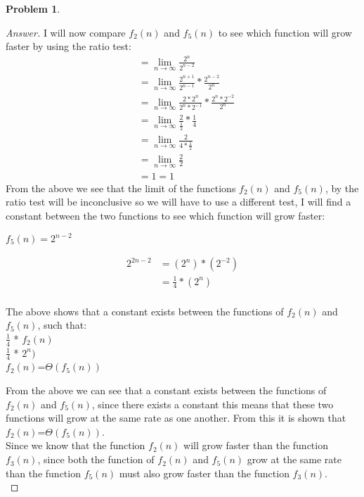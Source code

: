 \documentclass[11pt]{article}
\theoremstyle{definition}
\theoremstyle{definition}
\newtheorem{required}{Problem}
\theoremstyle{definition}
\begin{document}
\begin{required}
\begin{enumerate}[label=(\alph*)]
\begin{proof}[Answer]
I will now compare $f_2(n)$ and $f_5(n)$ to see which function will grow faster by using the ratio test: \\
\begin{align*}
&= \lim_{n \to \infty} \frac{2^n}{2^{n-2}} \\
&= \lim_{n \to \infty} \frac{2^{n+1}}{2^{n-1}} * \frac{2^{n-2}}{2^{n}} \\
&= \lim_{n \to \infty} \frac{2*2^{n}}{2^{n}*2^{-1}} * \frac{2^{n}*2^{-2}}{2^{n}} \\
&= \lim_{n \to \infty} \frac{2}{\frac{1}{2}} * \frac{1}{4}\\
&= \lim_{n \to \infty} \frac{2}{4*\frac{1}{2}} \\
&= \lim_{n \to \infty} \frac{2}{2} \\
&= 1 = 1
\end{align*}
From the above we see that the limit of the functions $f_2(n)$ and $f_5(n)$, by the ratio test will be inconclusive so we will have to use a different test, I will find a constant between the two functions to see which function will grow faster: \\
\begin{center}
$f_5(n) = 2^{n-2} $
\end{center} 
\begin{align*}
2^{2n-2} &= (2^n) * (2^{-2}) \\
&= \frac{1}{4} * (2^n) \\
\end{align*}
\begin{center}
The above shows that a constant exists between the functions of $f_2(n)$ and $f_5(n)$, such that: \\
$\frac{1}{4}$ * $f_2(n)$ \\
$\frac{1}{4}$ * $2^{n})$ \\
$f_2(n)$=$\Theta(f_5(n))$ \\
\end{center}
From the above we can see that a constant exists between the functions of $f_2(n)$ and $f_5(n)$, since there exists a constant this means that these two functions will grow at the same rate as one another. From this it is shown that  $f_2(n)$=$\Theta(f_5(n))$. \\

Since we know that the function  $f_2(n)$ will grow faster than the function $f_3(n)$, since both the function of  $f_2(n)$ and $f_5(n)$ grow at the same rate than the function $f_5(n)$ must also grow faster than the function $f_3(n)$. \\


\end{proof}
\end{enumerate}
\end{required}
\end{document}

